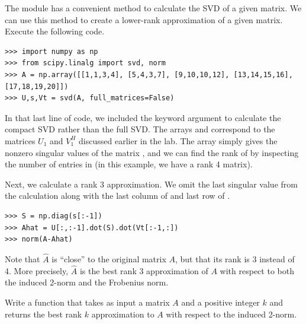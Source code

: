 The  module has a convenient method to calculate the SVD of a given matrix. We can use
this method to create a lower-rank approximation of a given matrix. Execute the following code.
\begin{lstlisting}
>>> import numpy as np
>>> from scipy.linalg import svd, norm
>>> A = np.array([[1,1,3,4], [5,4,3,7], [9,10,10,12], [13,14,15,16], [17,18,19,20]])
>>> U,s,Vt = svd(A, full_matrices=False)
\end{lstlisting}
In that last line of code, we included the keyword argument  to calculate the
compact SVD rather than the full SVD. The arrays  and  correspond to the matrices
$U_1$ and $V_1^H$ discussed earlier in the lab. The array  simply gives the nonzero singular values
of the matrix , and we can find the rank of  by inspecting the number of entries in  (in this
example, we have a rank 4 matrix). 

Next, we calculate a rank 3 approximation.
We omit the last singular value from the calculation along with the last column of  and last row of .

\begin{lstlisting}
>>> S = np.diag(s[:-1])
>>> Ahat = U[:,:-1].dot(S).dot(Vt[:-1,:])
>>> norm(A-Ahat)
\end{lstlisting}
Note that $\widehat A$ is ``close'' to the original matrix $A$, but that its rank is 3 instead of 4. More
precisely, $\widehat A$ is the best rank 3 approximation of $A$ with respect to both the induced 2-norm and
the Frobenius norm. 

\begin{problem}
Write a function  that takes as input a matrix $A$ and a positive integer $k$ and returns 
the best rank $k$ approximation to $A$ with respect to the induced 2-norm.
\label{prob:svd_approx}
\end{problem}





